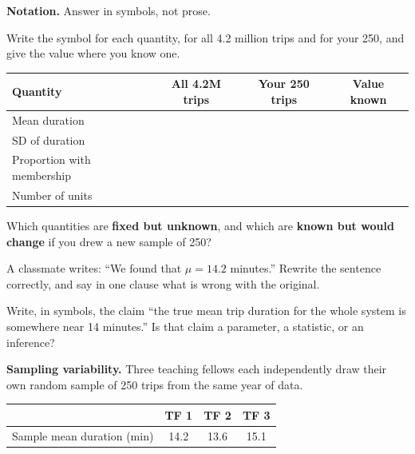 \documentclass[11pt]{article}
\newcommand{\answerspace}[1]{\vspace{#1}}
\begin{document}
\begin{questions}

\item \textbf{Notation.} Answer in symbols, not prose.

\begin{parts}
\item Write the symbol for each quantity, for all 4.2 million trips and for your 250, and give
the value where you know one.

\begin{center}
\renewcommand{\arraystretch}{1.6}
\begin{tabularx}{\linewidth}{Lccc}
\toprule
\textbf{Quantity} & \textbf{All 4.2M trips} & \textbf{Your 250 trips} & \textbf{Value known} \\
\midrule
Mean duration & & & \\
SD of duration & & & \\
Proportion with membership & & & \\
Number of units & & & \\
\bottomrule
\end{tabularx}
\end{center}

\item Which quantities are \textbf{fixed but unknown}, and which are \textbf{known but would
change} if you drew a new sample of 250?
\answerspace{4em}

\item A classmate writes: ``We found that $\mu = 14.2$ minutes.'' Rewrite the sentence
correctly, and say in one clause what is wrong with the original.
\answerspace{4em}

\item Write, in symbols, the claim ``the true mean trip duration for the whole system is
somewhere near 14 minutes.'' Is that claim a parameter, a statistic, or an inference?
\answerspace{3.5em}
\end{parts}

\item \textbf{Sampling variability.} Three teaching fellows each independently draw their own
random sample of 250 trips from the same year of data.

\begin{center}
\renewcommand{\arraystretch}{1.2}
\begin{tabular}{lccc}
\toprule
 & \textbf{TF 1} & \textbf{TF 2} & \textbf{TF 3} \\
\midrule
Sample mean duration (min) & 14.2 & 13.6 & 15.1 \\
\bottomrule
\end{tabular}
\end{center}


\end{questions}
\end{document}
